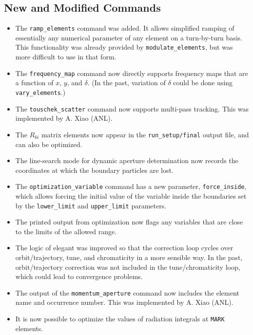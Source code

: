 \documentclass[11pt]{article}
\begin{document}
\subsection{New and Modified Commands}
\begin{itemize}
\item The {\tt ramp\_elements} command was added.  It allows simplified ramping of essentially
 any numerical parameter of any element on a turn-by-turn basis.  This functionality was
 already provided by {\tt modulate\_elements}, but was more difficult to use in that form.
\item The \verb|frequency_map| command now directly supports frequency maps that are a function of 
  $x$, $y$, and $\delta$.  (In the past, variation of $\delta$ could be done using \verb|vary_elements|.)
\item The \verb|touschek_scatter| command now supports multi-pass tracking.  This was implemented by A. Xiao (ANL).
\item The $R_{6i}$ matrix elements now appear in the \verb|run_setup/final| output file, and can also be
  optimized.
\item The line-search mode for dynamic aperture determination now records the coordinates at which the boundary
  particles are lost.
\item The {\tt optimization\_variable} command has a new parameter, {\tt force\_inside}, which 
  allows forcing the initial value of the variable inside the boundaries set by the 
  {\tt lower\_limit} and {\tt upper\_limit} parameters.
\item The printed output from optimization now flags any variables that are close to the
  limits of the allowed range.
\item The logic of elegant was improved so that the correction loop cycles over orbit/trajectory, tune, and chromaticity in a more
  sensible way.  In the past, orbit/trajectory correction was not included in the tune/chromaticity loop, which could lead to
  convergence problems.
\item The output of the \verb|momentum_aperture| command now includes the element name and occurrence number.  This was
  implemented by A. Xiao (ANL).
\item It is now possible to optimize the values of radiation integrals at {\tt MARK} elements.
\end{itemize}

\end{document}
